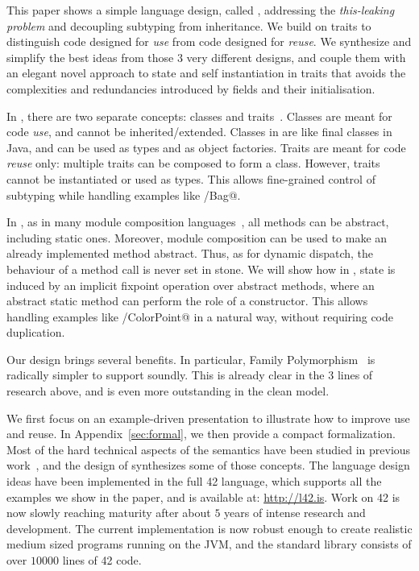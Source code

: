 This paper shows a simple language design, called \name,
addressing the \emph{this-leaking problem} and decoupling subtyping from inheritance.
We build on traits to distinguish code designed for
\emph{use} from code designed for \emph{reuse}.
We synthesize and simplify the best ideas from those $3$ very
different designs, and couple them with an elegant novel approach to
state and self instantiation in traits that avoids the complexities and redundancies introduced by fields and their initialisation.

In \name, there are two separate concepts: classes
and traits~\cite{ducasse2006traits}. Classes are meant for code \emph{use}, and cannot be inherited/extended. Classes in \name are like final classes in
Java, and can be used as types and as object factories. Traits are meant for code \emph{reuse} only: multiple traits can be
composed to form a class. However, traits 
cannot be instantiated or used as types.
This allows fine-grained control of subtyping while handling examples like \Q@Set/Bag@.

In \name, as in many module composition languages~\cite{ancona2002calculus},
all methods can be abstract, including static ones.
Moreover, module composition can be used to make
an already implemented method abstract.
Thus, as for dynamic dispatch, the behaviour of a method call is never set in stone.
We will show how in \name, state is induced by an implicit fixpoint operation over abstract methods,
where an abstract static method can perform the role of a constructor.
This allows handling examples like \Q@Point/ColorPoint@ in a natural way, without requiring code duplication.

Our design brings several benefits. In particular, 
Family Polymorphism~\cite{ernst2004expression} is
radically simpler to support soundly.
This is already clear in the $3$ lines of
research above, and is even more outstanding in the clean \name model.

We first focus on an example-driven presentation to illustrate how to
improve use and reuse. 
In Appendix~\ref{sec:formal}, we then provide a compact formalization.
Most of the hard technical aspects of the
semantics have been studied in previous 
work~\cite{Bettini:2010:ISP:1774088.1774530,BETTINI2013521,Bettini2015282,KrogdahlMS09,DBLP:journals/taosd/AxelsenSKM12,DBLP:conf/gpce/AxelsenK12,deep,servetto2014meta,fjig},
and the design of \name synthesizes some of those concepts.
The language design ideas have been implemented in the full 42 language, which supports all
the examples we show in the paper, and is available at: \url{http://l42.is}.
Work on 42 is now slowly reaching maturity after about $5$ years of
intense research and development. The current implementation 
is now robust enough to create realistic medium sized programs running 
on the JVM, and the standard library consists of over $10000$ lines of
42 code. 

